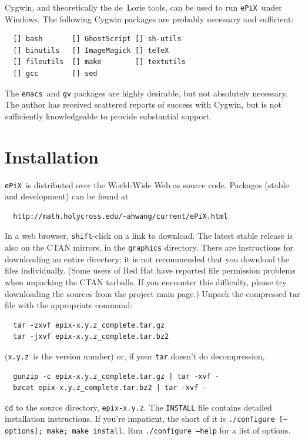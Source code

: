 \documentclass[12pt]{report}
\newcommand{\code}[1]{\texttt{#1}}
\newcommand{\filename}[1]{\texttt{#1}}
\newcommand{\ePiX}{\code{ePiX}}
\begin{document}
Cygwin, and theoretically the de~Lorie tools, can be used to run
\ePiX\ under Windows. The following Cygwin packages are probably
necessary and sufficient: 
\begin{verbatim}
  [] bash       [] GhostScript [] sh-utils
  [] binutils   [] ImageMagick [] teTeX
  [] fileutils  [] make        [] textutils
  [] gcc        [] sed
\end{verbatim}

The \filename{emacs}~and \filename{gv} packages are highly desirable,
but not absolutely necessary. The author has received scattered
reports of success with Cygwin, but is not sufficiently knowledgeable
to provide substantial support.


\section{Installation}

\ePiX\ is distributed over the World-Wide Web as source code. Packages
(stable and development) can be found at
\begin{verbatim}
  http://math.holycross.edu/~ahwang/current/ePiX.html
\end{verbatim}
In a web browser, \texttt{shift}-click on a link to download.  The
latest stable release is also on the CTAN mirrors, in the
\code{graphics} directory. There are instructions for downloading an
entire directory; it is not recommended that you download the files
individually.  (Some users of Red Hat have reported file permission
problems when unpacking the CTAN tarballs. If you encounter this
difficulty, please try downloading the sources from the project main
page.)  Unpack the compressed tar file with the appropriate command:
\begin{verbatim}
  tar -zxvf epix-x.y.z_complete.tar.gz
  tar -jxvf epix-x.y.z_complete.tar.bz2
\end{verbatim}
(\code{x.y.z}~is the version number) or, if your \code{tar}
doesn't do decompression,
\begin{verbatim}
  gunzip -c epix-x.y.z_complete.tar.gz | tar -xvf -
  bzcat epix-x.y.z_complete.tar.bz2 | tar -xvf -
\end{verbatim}
\code{cd} to the source directory, \filename{epix-x.y.z}.  The
\filename{INSTALL} file contains detailed installation instructions.
If you're impatient, the short of it is \code{./configure [--options];
  make; make install}.  Run \code{./configure --help} for a list of
options.
\end{document}
